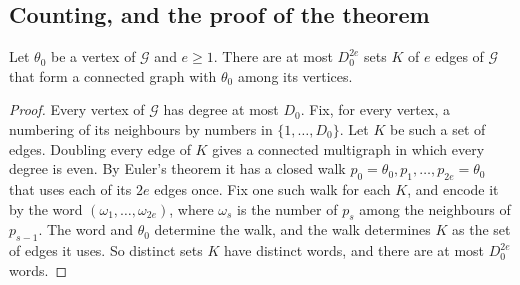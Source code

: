 \subsection{Counting, and the proof of the theorem}\label{fgt:sec-proof}

\begin{lemma}\label{fgt:count}
Let $\theta_0$ be a vertex of $\mathcal G$ and $e\ge1$. There are at most $D_0^{2e}$ sets $K$ of $e$ edges of $\mathcal G$ that form a connected graph with $\theta_0$ among its vertices.
\end{lemma}

\begin{proof}
Every vertex of $\mathcal G$ has degree at most $D_0$. Fix, for every vertex, a numbering of its neighbours by numbers in $\{1,\dots,D_0\}$. Let $K$ be such a set of edges. Doubling every edge of $K$ gives a connected multigraph in which every degree is even. By Euler's theorem it has a closed walk $p_0=\theta_0,p_1,\dots,p_{2e}=\theta_0$ that uses each of its $2e$ edges once. Fix one such walk for each $K$, and encode it by the word $(\omega_1,\dots,\omega_{2e})$, where $\omega_s$ is the number of $p_s$ among the neighbours of $p_{s-1}$. The word and $\theta_0$ determine the walk, and the walk determines $K$ as the set of edges it uses. So distinct sets $K$ have distinct words, and there are at most $D_0^{2e}$ words.
\end{proof}

